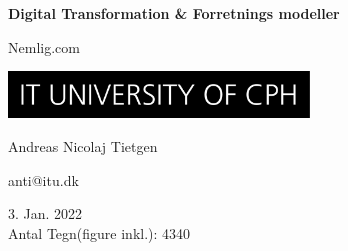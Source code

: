 \documentclass[11pt]{article}
\begin{document}
\begin{titlepage}
    \begin{center}
        \huge
        \textbf{Digital Transformation \& Forretnings modeller}

        \vspace{0.5cm}
        Nemlig.com

        \vspace{3cm}
        \includegraphics[width=0.6\textwidth]{itu.jpeg}

        \vspace{3cm}
        \large
        Andreas Nicolaj Tietgen 
        
        anti@itu.dk

        \vfill
        3. Jan. 2022 \\
        Antal Tegn(figure inkl.): 4340
    \end{center}
\end{titlepage}

\newpage

\tableofcontents

\newpage




\newpage
\printbibliography

\newpage

\end{document}
